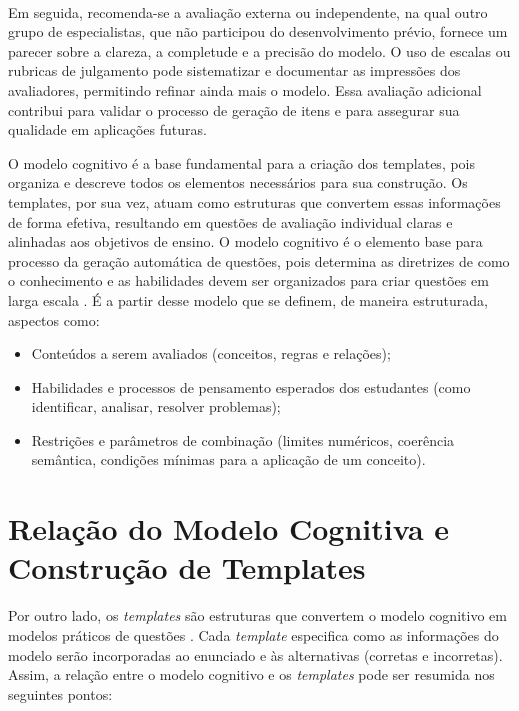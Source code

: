 \paragraph{}Em seguida, recomenda-se a avaliação externa ou independente, na qual outro grupo de especialistas, que não participou do desenvolvimento prévio, fornece um parecer sobre a clareza, a completude e a precisão do modelo. O uso de escalas ou rubricas de julgamento pode sistematizar e documentar as impressões dos avaliadores, permitindo refinar ainda mais o modelo. Essa avaliação adicional contribui para validar o processo de geração de itens e para assegurar sua qualidade em aplicações futuras.




O modelo cognitivo é a base fundamental para a criação dos templates, pois organiza e descreve todos os elementos necessários para sua construção. Os templates, por sua vez, atuam como estruturas que convertem essas informações de forma efetiva, resultando em questões de avaliação individual claras e alinhadas aos objetivos de ensino.
O modelo cognitivo é o elemento base para processo da geração automática de questões, pois determina as diretrizes de como o conhecimento e as habilidades devem ser organizados para criar questões em larga escala \cite{gierl2016, gierl2017, gierlbulutzhang2018, keehner2017}. É a partir desse modelo que se definem, de maneira estruturada, aspectos como:

\begin{itemize} \item Conteúdos a serem avaliados (conceitos, regras e relações); \item Habilidades e processos de pensamento esperados dos estudantes (como identificar, analisar, resolver problemas); \item Restrições e parâmetros de combinação (limites numéricos, coerência semântica, condições mínimas para a aplicação de um conceito). \end{itemize}



\section{Relação do Modelo Cognitiva e Construção de Templates }

Por outro lado, os \textit{templates} são estruturas que convertem o modelo cognitivo em modelos práticos de questões \cite{gierl2024}. Cada \textit{template} especifica como as informações do modelo serão incorporadas ao enunciado e às alternativas (corretas e incorretas). Assim, a relação entre o modelo cognitivo e os \textit{templates} pode ser resumida nos seguintes pontos:

